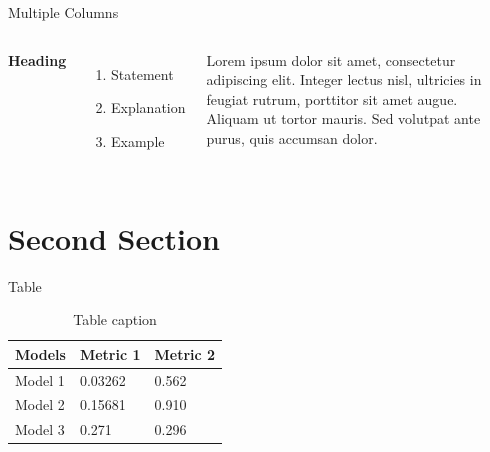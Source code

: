 \documentclass[aspectratio=169,xcolor=dvipsnames]{beamer}
\begin{document}

\begin{frame}{Multiple Columns}
    \begin{columns}[c] %

        \textbf{Heading}
        \begin{enumerate}
            \item Statement
            \item Explanation
            \item Example
        \end{enumerate}

        Lorem ipsum dolor sit amet, consectetur adipiscing elit. Integer lectus nisl, ultricies in feugiat rutrum, porttitor sit amet augue. Aliquam ut tortor mauris. Sed volutpat ante purus, quis accumsan dolor.

    \end{columns}
\end{frame}

\section{Second Section}

\begin{frame}{Table}
    \begin{table}
        \begin{tabular}{l l l}
            \toprule
            \textbf{Models} & \textbf{Metric 1} & \textbf{Metric 2} \\
            \midrule
            Model 1         & 0.03262           & 0.562               \\
            Model 2         & 0.15681           & 0.910               \\
            Model 3         & 0.271           & 0.296               \\
            \bottomrule
        \end{tabular}
        \caption{Table caption}
    \end{table}
\end{frame}

\end{document}
